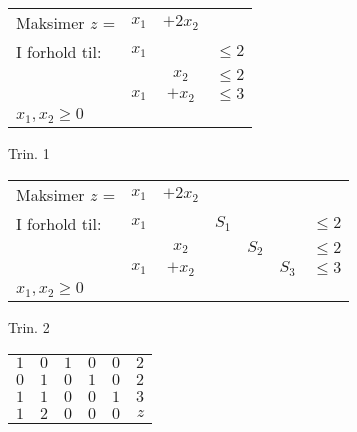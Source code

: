 \begin{eks}
\begin{center}
\begin{tabular}{ l  c  c  r }
Maksimer $z$ =&$x_1$ & $+2x_2$&\\
I forhold til: &$x_1$ & & $\leq 2$\\
& &$x_2$ & $\leq 2$\\
&$x_1$&$+x_2$&$\leq 3$\\
$x_1,x_2\geq 0$
\end{tabular}
\end{center}
Trin. 1\\
\begin{center}
\begin{tabular}{ l  c  c  c  c  c  r }
Maksimer $z$ =&$x_1$ & $+2x_2$&&&&\\
I forhold til: &$x_1$&&$S_1$&&& $\leq 2$\\
&&$x_2$ &&$S_2$ && $\leq 2$\\
&$x_1$&$+x_2$&&&$S_3$&$\leq 3$\\
$x_1,x_2\geq 0$
\end{tabular}
\end{center}
Trin. 2\\
\begin{center}
\begin{tabular}{| l  c  | c  c  c | r |}
\hline
$1$&$0$&$1$&$0$&$0$&$2$\\
$0$&$1$&$0$&$1$&$0$&$2$\\
$1$&$1$&$0$&$0$&$1$&$3$\\ \hline
$1$&$2$&$0$&$0$&$0$&$z$\\
\hline
\end{tabular}
\end{center}


\end{eks}
